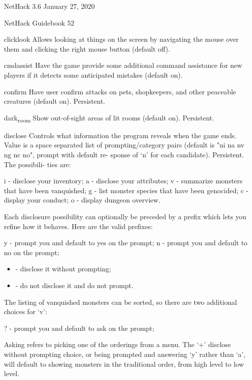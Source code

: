 \documentclass[11pt]{article}
\begin{document}
NetHack 3.6                   January 27, 2020





NetHack Guidebook                       52



clicklook
 Allows looking at things on the screen by navigating the mouse
 over them and clicking the right mouse button (default off).

cmdassist
 Have the game provide some additional command assistance for
 new players if it detects some anticipated mistakes (default
 on).

confirm
 Have user confirm attacks on pets, shopkeepers, and other
 peaceable creatures (default on). Persistent.

dark\textsubscript{room}
 Show out-of-sight areas of lit rooms (default on). Persistent.

disclose
 Controls what information the program reveals when the game
 ends.  Value is a space separated list of prompting/category
 pairs (default is "ni na nv ng nc no", prompt with default re-
 sponse of `n' for each candidate). Persistent. The possibili-
 ties are:

i - disclose your inventory;
a - disclose your attributes;
v - summarize monsters that have been vanquished;
g - list monster species that have been genocided;
c - display your conduct;
o - display dungeon overview.

Each disclosure possibility can optionally be preceded by a
prefix which lets you refine how it behaves. Here are the
valid prefixes:

y - prompt you and default to yes on the prompt;
n - prompt you and default to no on the prompt;
\begin{itemize}
\item - disclose it without prompting;
\item - do not disclose it and do not prompt.
\end{itemize}

The listing of vanquished monsters can be sorted, so there are
two additional choices for `v':

? - prompt you and default to ask on the prompt;

Asking refers to picking one of the orderings from a menu. The
`+' disclose without prompting choice, or being prompted and
answering `y' rather than `a', will default to showing monsters
in the traditional order, from high level to low level.
\end{document}
